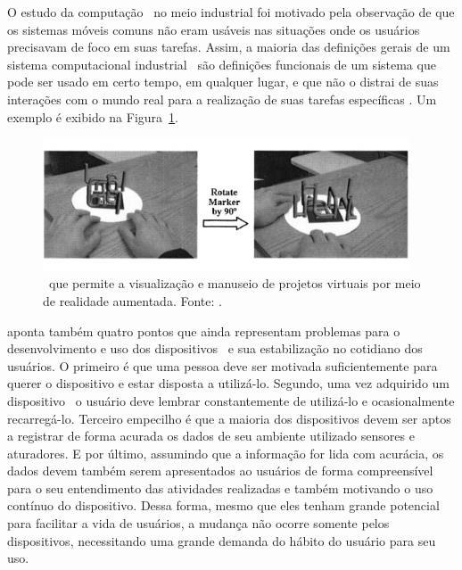         
        O estudo da computação \wearable\ no meio industrial foi motivado pela observação de que os sistemas móveis comuns não eram usáveis nas situações onde os usuários precisavam de foco em suas tarefas.
        Assim, a maioria das definições gerais de um sistema computacional industrial \wearable\ são definições funcionais de um sistema que pode ser usado em certo tempo, em qualquer lugar, e que não o distrai de suas interações com o mundo real para a realização de suas tarefas específicas \citep{lawo2007industrial}.
        Um exemplo é exibido na Figura~\ref{fig:industry}.
        
        \begin{figure}[h] \centering
            \includegraphics[width=0.97\textwidth]{img/rb-industry.png}
            \caption{\Wearable\ que permite a visualização e manuseio de projetos virtuais por meio de realidade aumentada. Fonte: \citet{dunston2005mixed}.}
            \label{fig:industry}
        \end{figure}
        
        \citet{patel2015wearable} aponta também quatro pontos que ainda representam problemas para o desenvolvimento e uso dos dispositivos \wearable\ e sua estabilização no cotidiano dos usuários.
        O primeiro é que uma pessoa deve ser motivada suficientemente para querer o dispositivo e estar disposta a utilizá-lo.
        Segundo, uma vez adquirido um dispositivo \wearable\ o usuário deve lembrar constantemente de utilizá-lo e ocasionalmente recarregá-lo.
        Terceiro empecilho é que a maioria dos dispositivos devem ser aptos a registrar de forma acurada os dados de seu ambiente utilizado sensores e aturadores.
        E por último, assumindo que a informação for lida com acurácia, os dados devem também serem apresentados ao usuários de forma compreensível para o seu entendimento das atividades realizadas e também motivando o uso contínuo do dispositivo.
        Dessa forma, mesmo que eles tenham grande potencial para facilitar a vida de usuários, a mudança não ocorre somente pelos dispositivos, necessitando uma grande demanda do hábito do usuário para seu uso.
        

